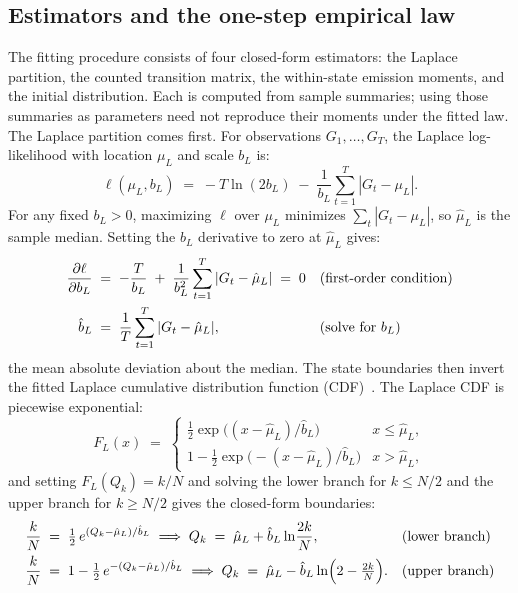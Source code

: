 \subsection{Estimators and the one-step empirical law}
\label{sec:supp-gen-estimators}

The fitting procedure consists of four closed-form estimators: the
Laplace partition, the counted transition matrix, the within-state
emission moments, and the initial distribution. Each is computed from sample summaries; using those summaries as
parameters need not reproduce their moments under the fitted law.
The Laplace partition comes first. For observations $G_1, \dots, G_T$, the Laplace
log-likelihood with location $\mu_L$ and scale $b_L$ is:
\begin{equation}
  \ell(\mu_L, b_L) \;=\;
  -T \ln (2 b_L) \;-\; \frac{1}{b_L} \sum_{t=1}^{T} |G_t - \mu_L|.
  \label{eq:supp-laplace-ll}
\end{equation}
For any fixed $b_L > 0$, maximizing $\ell$ over $\mu_L$ minimizes
$\sum_t |G_t - \mu_L|$, so $\hat\mu_L$ is the sample median. Setting
the $b_L$ derivative to zero at $\hat\mu_L$ gives:
\begin{align}
  \frac{\partial \ell}{\partial b_L}
   &\;=\; -\frac{T}{b_L}
     \;+\; \frac{1}{b_L^2} \sum_{t=1}^{T} |G_t - \hat\mu_L|
     \;=\; 0
     && \text{(first-order condition)} \notag \\
  \hat b_L
   &\;=\; \frac{1}{T} \sum_{t=1}^{T} |G_t - \hat\mu_L|,
     && \text{(solve for $b_L$)}
  \label{eq:supp-laplace-mle}
\end{align}
the mean absolute deviation about the median. The state boundaries
then invert the fitted Laplace cumulative distribution function
(CDF)~\cite{kotzKozubowskiPodgorski2001}. The Laplace CDF is
piecewise exponential:
\begin{equation}
  F_L(x) \;=\;
  \begin{cases}
    \tfrac{1}{2} \exp\!\big((x - \hat\mu_L)/\hat b_L\big)
      & x \le \hat\mu_L,\\[4pt]
    1 - \tfrac{1}{2} \exp\!\big(-(x - \hat\mu_L)/\hat b_L\big)
      & x > \hat\mu_L,
  \end{cases}
  \label{eq:supp-laplace-cdf}
\end{equation}
and setting $F_L(Q_k) = k/N$ and solving the lower branch for
$k \le N/2$ and the upper branch for $k \ge N/2$ gives the closed-form
boundaries:
\begin{align}
  \frac{k}{N} &\;=\; \tfrac{1}{2}\,
    e^{(Q_k - \hat\mu_L)/\hat b_L}
  \;\Longrightarrow\;
  Q_k \;=\; \hat\mu_L + \hat b_L \ln\!\frac{2k}{N},
    && \text{(lower branch)} \notag \\
  \frac{k}{N} &\;=\; 1 - \tfrac{1}{2}\,
    e^{-(Q_k - \hat\mu_L)/\hat b_L}
  \;\Longrightarrow\;
  Q_k \;=\; \hat\mu_L - \hat b_L
    \ln\!\Big(2 - \tfrac{2k}{N}\Big).
    && \text{(upper branch)}
  \label{eq:supp-quantiles}
\end{align}
